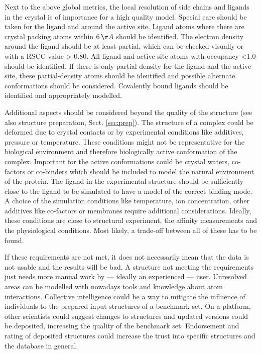 \documentclass[9pt,bestpractices]{livecoms}
\begin{document}
Next to the above global metrics, the local resolution of side chains and ligands in the crystal is of importance for a high quality model. Special care should be taken for the ligand and around the active site. 
%
Ligand atoms where there are crystal packing atoms within $6\,\AA$ should be identified. The electron density around the ligand should be at least partial, which can be checked visually or with a RSCC value > 0.80.
%
All ligand and active site atoms with occupancy <1.0 should be identified.
%
If there is only partial density for the ligand and the active site, these partial-density atoms should be identified and possible alternate conformations should be considered. 
%
Covalently bound ligands should be identified and appropriately modelled.


Additional aspects should be considered beyond the quality of the structure (see also structure preparation, Sect. \ref{sec:prep}).
%
The structure of a complex could be deformed due to crystal contacts
or by experimental conditions like additives, pressure or temperature. These conditions might not be representative for the biological environment and therefore biologically active conformation of the complex.
%
Important for the active conformations could be crystal waters, co-factors or co-binders which should be included to model the natural environment of the protein.
%
The ligand in the experimental structure should be sufficiently close to the ligand to be simulated to have a model of the correct binding mode. 
%
A choice of the simulation conditions like temperature, ion concentration, other additives like co-factors or membranes require additional considerations. Ideally, these conditions are close to structural experiment, the affinity measurements and the physiological conditions. Most likely, a trade-off between all of these has to be found. 
    
%
If these requirements are not met, it does not necessarily mean that the data is not usable and the results will be bad. A structure not meeting the requirements just needs more manual work by --- ideally an experienced --- user. Unresolved areas can be modelled with nowadays tools and knowledge about atom interactions.
%
Collective intelligence could be a way to mitigate the influence of individuals to the prepared input structures of a benchmark set. On a platform, other scientists could suggest changes to structures and updated versions could be deposited, increasing the quality of the benchmark set. Endorsement and rating of deposited structures could increase the trust into specific structures and the database in general.
\end{document}
